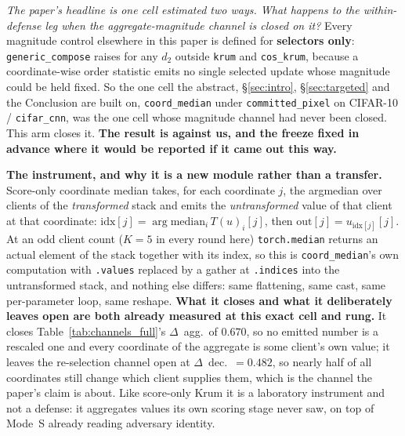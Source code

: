 \documentclass{article}
\begin{document}
\noindent \emph{The paper's headline is one cell estimated two ways. What happens to the within-defense leg when the aggregate-magnitude channel is closed on it?} Every magnitude control elsewhere in this paper is defined for \textbf{selectors only}: \texttt{generic\_compose} raises for any $d_2$ outside \texttt{krum} and \texttt{cos\_krum}, because a coordinate-wise order statistic emits no single selected update whose magnitude could be held fixed. So the one cell the abstract, §\ref{sec:intro}, §\ref{sec:targeted} and the Conclusion are built on, \texttt{coord\_median} under \texttt{committed\_pixel} on CIFAR-10 / \texttt{cifar\_cnn}, was the one cell whose magnitude channel had never been closed. This arm closes it. \textbf{The result is against us, and the freeze fixed in advance where it would be reported if it came out this way.}

\textbf{The instrument, and why it is a new module rather than a transfer.} Score-only coordinate median takes, for each coordinate $j$, the argmedian over clients of the \emph{transformed} stack and emits the \emph{untransformed} value of that client at that coordinate: $\mathrm{idx}[j] = \arg\mathrm{median}_i\, T(u)_i[j]$, then $\mathrm{out}[j] = u_{\mathrm{idx}[j]}[j]$. At an odd client count ($K{=}5$ in every round here) \texttt{torch.median} returns an actual element of the stack together with its index, so this is \texttt{coord\_median}'s own computation with \texttt{.values} replaced by a gather at \texttt{.indices} into the untransformed stack, and nothing else differs: same flattening, same cast, same per-parameter loop, same reshape. \textbf{What it closes and what it deliberately leaves open are both already measured at this exact cell and rung.} It closes Table~\ref{tab:channels_full}'s $\Delta$~agg.\ of $0.670$, so no emitted number is a rescaled one and every coordinate of the aggregate is some client's own value; it leaves the re-selection channel open at $\Delta$~dec.\ $=0.482$, so nearly half of all coordinates still change which client supplies them, which is the channel the paper's claim is about. Like score-only Krum it is a laboratory instrument and not a defense: it aggregates values its own scoring stage never saw, on top of Mode~S already reading adversary identity.
\end{document}
